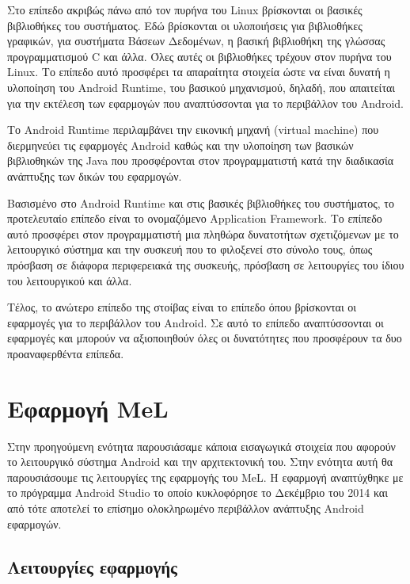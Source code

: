 Στο επίπεδο ακριβώς πάνω από τον πυρήνα του \textlatin{Linux} βρίσκονται οι βασικές βιβλιοθήκες του συστήματος. Εδώ βρίσκονται οι υλοποιήσεις για βιβλιοθήκες γραφικών, για συστήματα Βάσεων Δεδομένων, η βασική βιβλιοθήκη της γλώσσας προγραμματισμού \textlatin{C} και άλλα. Όλες αυτές οι βιβλιοθήκες τρέχουν στον πυρήνα του \textlatin{Linux}. Το επίπεδο αυτό προσφέρει τα απαραίτητα στοιχεία ώστε να είναι δυνατή η υλοποίηση του \textlatin{Android Runtime}, του βασικού μηχανισμού, δηλαδή, που απαιτείται για την εκτέλεση των εφαρμογών που αναπτύσσονται για το περιβάλλον του \textlatin{Android}. 

Το \textlatin{Android Runtime} περιλαμβάνει την εικονική μηχανή (\textlatin{virtual machine}) που διερμηνεύει τις εφαρμογές \textlatin{Android} καθώς και την υλοποίηση των βασικών βιβλιοθηκών της \textlatin{Java} που προσφέρονται στον προγραμματιστή κατά την διαδικασία ανάπτυξης των δικών του εφαρμογών.

Βασισμένο στο \textlatin{Android Runtime} και στις βασικές βιβλιοθήκες του συστήματος, το προτελευταίο επίπεδο είναι το ονομαζόμενο \textlatin{Application Framework}. Το επίπεδο αυτό προσφέρει στον προγραμματιστή μια πληθώρα δυνατοτήτων σχετιζόμενων με το λειτουργικό σύστημα και την συσκευή που το φιλοξενεί στο σύνολο τους, όπως πρόσβαση σε διάφορα περιφερειακά της συσκευής, πρόσβαση σε λειτουργίες του ίδιου του λειτουργικού και άλλα.

Τέλος, το ανώτερο επίπεδο της στοίβας είναι το επίπεδο όπου βρίσκονται οι εφαρμογές για το περιβάλλον του \textlatin{Android}. Σε αυτό το επίπεδο αναπτύσσονται οι εφαρμογές και μπορούν να αξιοποιηθούν όλες οι δυνατότητες που προσφέρουν τα δυο προαναφερθέντα επίπεδα.\section{Εφαρμογή \textlatin{MeL}}

Στην προηγούμενη ενότητα παρουσιάσαμε κάποια εισαγωγικά στοιχεία που αφορούν το λειτουργικό σύστημα \textlatin{Android} και την αρχιτεκτονική του. Στην ενότητα αυτή θα παρουσιάσουμε τις λειτουργίες της εφαρμογής του \textlatin{MeL}. Η εφαρμογή αναπτύχθηκε με το πρόγραμμα \textlatin{Android Studio \cite{android_studio}} το οποίο κυκλοφόρησε το Δεκέμβριο του 2014 και από τότε αποτελεί το επίσημο ολοκληρωμένο περιβάλλον ανάπτυξης \textlatin{Android} εφαρμογών.

\subsection{Λειτουργίες εφαρμογής}



